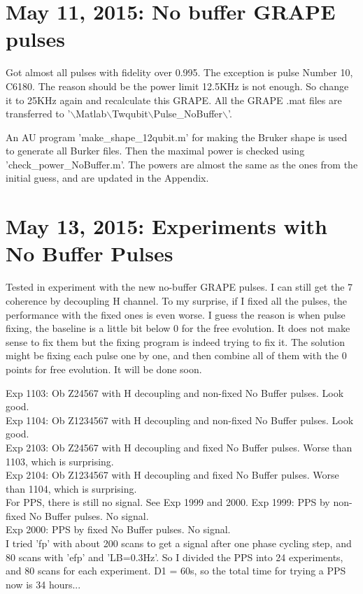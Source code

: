\documentclass[prl,onecolumn]{revtex4-1}
\newcommand{\dir}{$\backslash$}
\begin{document}
\newpage
\section{May 11, 2015: No buffer GRAPE pulses}
Got almost all pulses with fidelity over 0.995. The exception is pulse Number 10, C6180. The reason should be the power limit 12.5KHz is not enough. So change it to 25KHz again and recalculate this GRAPE. All the GRAPE .mat files are transferred to '\dir Matlab\dir Twqubit\dir Pulse\_NoBuffer\dir'.

An AU program 'make\_shape\_12qubit.m' for making the Bruker shape is used to generate all Burker files. Then the maximal power is checked using 'check\_power\_NoBuffer.m'. The powers are almost the same as the ones from the initial guess, and are updated in the Appendix.

\newpage
\section{May 13, 2015: Experiments with No Buffer Pulses}

Tested in experiment with the new no-buffer GRAPE pulses. I can still get the 7 coherence by decoupling H channel. To my surprise, if I fixed all the pulses, the performance with the fixed ones is even worse. I guess the reason is when pulse fixing, the baseline is a little bit below 0 for the free evolution. It does not make sense to fix them but the fixing program is indeed trying to fix it. The solution might be fixing each pulse one by one, and then combine all of them with the 0 points for free evolution. It will be done soon.

Exp 1103: Ob Z24567 with H decoupling and non-fixed No Buffer pulses. Look good. \\
Exp 1104: Ob Z1234567 with H decoupling and non-fixed No Buffer pulses. Look good. \\
Exp 2103: Ob Z24567 with H decoupling and fixed No Buffer pulses. Worse than 1103, which is surprising. \\
Exp 2104: Ob Z1234567 with H decoupling and fixed No Buffer pulses. Worse than 1104, which is surprising. \\

For PPS, there is still no signal. See Exp 1999 and 2000.
Exp 1999: PPS by non-fixed No Buffer pulses. No signal. \\
Exp 2000: PPS by fixed No Buffer pulses. No signal. \\

I tried 'fp' with about 200 scans to get a signal after one phase cycling step, and 80 scans with 'efp' and 'LB=0.3Hz'. So I divided the PPS into 24 experiments, and 80 scans for each experiment. D1 = 60s, so the total time for trying a PPS now is 34 hours...
\end{document}
